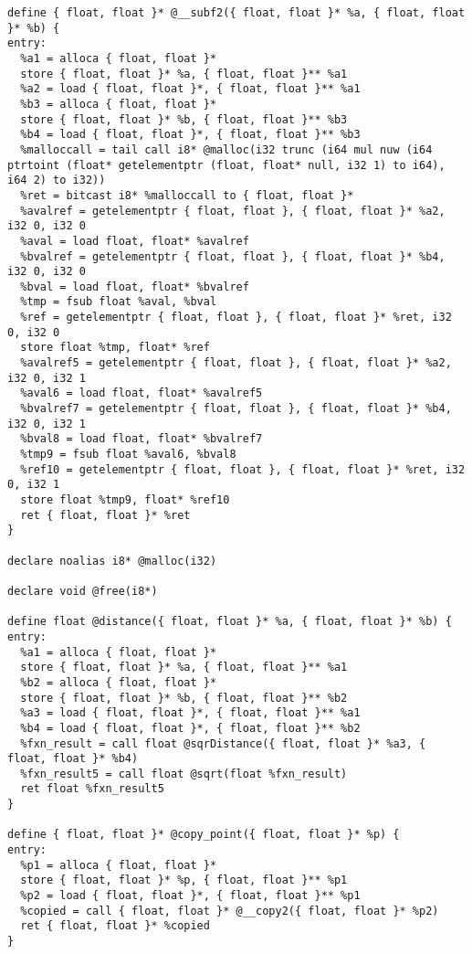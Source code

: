 \documentclass[main.tex]{subfiles}
\begin{document}
{\begin{lstlisting}
define { float, float }* @__subf2({ float, float }* %a, { float, float }* %b) {
entry:
  %a1 = alloca { float, float }*
  store { float, float }* %a, { float, float }** %a1
  %a2 = load { float, float }*, { float, float }** %a1
  %b3 = alloca { float, float }*
  store { float, float }* %b, { float, float }** %b3
  %b4 = load { float, float }*, { float, float }** %b3
  %malloccall = tail call i8* @malloc(i32 trunc (i64 mul nuw (i64 ptrtoint (float* getelementptr (float, float* null, i32 1) to i64), i64 2) to i32))
  %ret = bitcast i8* %malloccall to { float, float }*
  %avalref = getelementptr { float, float }, { float, float }* %a2, i32 0, i32 0
  %aval = load float, float* %avalref
  %bvalref = getelementptr { float, float }, { float, float }* %b4, i32 0, i32 0
  %bval = load float, float* %bvalref
  %tmp = fsub float %aval, %bval
  %ref = getelementptr { float, float }, { float, float }* %ret, i32 0, i32 0
  store float %tmp, float* %ref
  %avalref5 = getelementptr { float, float }, { float, float }* %a2, i32 0, i32 1
  %aval6 = load float, float* %avalref5
  %bvalref7 = getelementptr { float, float }, { float, float }* %b4, i32 0, i32 1
  %bval8 = load float, float* %bvalref7
  %tmp9 = fsub float %aval6, %bval8
  %ref10 = getelementptr { float, float }, { float, float }* %ret, i32 0, i32 1
  store float %tmp9, float* %ref10
  ret { float, float }* %ret
}

declare noalias i8* @malloc(i32)

declare void @free(i8*)

define float @distance({ float, float }* %a, { float, float }* %b) {
entry:
  %a1 = alloca { float, float }*
  store { float, float }* %a, { float, float }** %a1
  %b2 = alloca { float, float }*
  store { float, float }* %b, { float, float }** %b2
  %a3 = load { float, float }*, { float, float }** %a1
  %b4 = load { float, float }*, { float, float }** %b2
  %fxn_result = call float @sqrDistance({ float, float }* %a3, { float, float }* %b4)
  %fxn_result5 = call float @sqrt(float %fxn_result)
  ret float %fxn_result5
}

define { float, float }* @copy_point({ float, float }* %p) {
entry:
  %p1 = alloca { float, float }*
  store { float, float }* %p, { float, float }** %p1
  %p2 = load { float, float }*, { float, float }** %p1
  %copied = call { float, float }* @__copy2({ float, float }* %p2)
  ret { float, float }* %copied
}


\end{lstlisting}}
\end{document}
